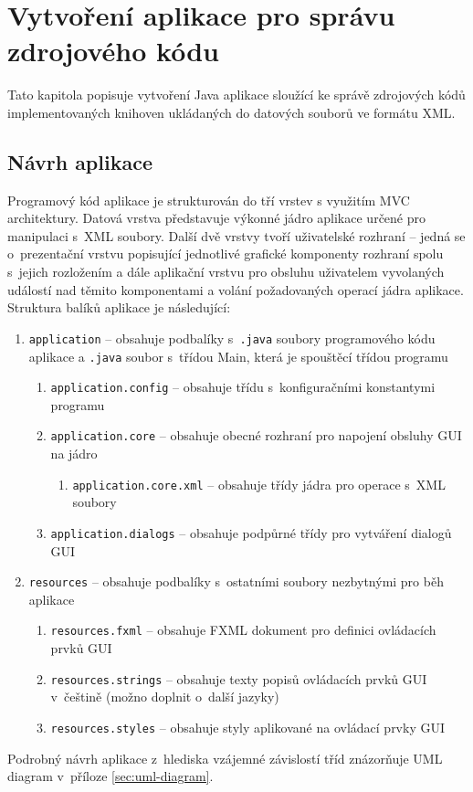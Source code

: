 \documentclass[czech,BP]{thesiskiv}
\begin{document}
\chapter{Vytvoření aplikace pro správu zdrojového kódu}
Tato kapitola popisuje vytvoření Java aplikace sloužící ke správě zdrojových kódů implementovaných knihoven ukládaných do datových souborů ve formátu XML.

\section{Návrh aplikace}

Programový kód aplikace je strukturován do tří vrstev s využitím MVC architektury. Datová vrstva představuje výkonné jádro aplikace určené pro manipulaci s~XML soubory. Další dvě vrstvy tvoří uživatelské rozhraní -- jedná se o~prezentační vrstvu popisující jednotlivé grafické komponenty rozhraní spolu s~jejich rozložením a dále aplikační vrstvu pro obsluhu uživatelem vyvolaných událostí nad těmito komponentami a volání požadovaných operací jádra aplikace. Struktura balíků aplikace je následující:
\begin{enumerate}
\item{\texttt{application} -- obsahuje podbalíky s~\texttt{.java} soubory programového kódu aplikace a \texttt{.java} soubor s~třídou Main, která je spouštěcí třídou programu}
\begin{enumerate}
\item{\texttt{application.config} -- obsahuje třídu s~konfiguračními konstantymi programu}
\item{\texttt{application.core} -- obsahuje obecné rozhraní pro napojení obsluhy GUI na jádro}
\begin{enumerate}
\item{\texttt{application.core.xml} -- obsahuje třídy jádra pro operace s~XML soubory}
\end{enumerate}
\item{\texttt{application.dialogs} -- obsahuje podpůrné třídy pro vytváření dialogů GUI}
\end{enumerate}
\item{\texttt{resources} -- obsahuje podbalíky s~ostatními soubory nezbytnými pro běh aplikace}
\begin{enumerate}
\item{\texttt{resources.fxml} -- obsahuje FXML dokument pro definici ovládacích prvků GUI}
\item{\texttt{resources.strings} -- obsahuje texty popisů ovládacích prvků GUI v~češtině (možno doplnit o~další jazyky)}
\item{\texttt{resources.styles} -- obsahuje styly aplikované na ovládací prvky GUI}
\end{enumerate}
\end{enumerate}
Podrobný návrh aplikace z~hlediska vzájemné závislostí tříd znázorňuje UML diagram v~příloze \ref{sec:uml-diagram}.
\end{document}
